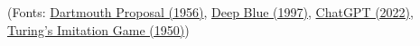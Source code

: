 (Fonts: \href{https://raysolomonoff.com/dartmouth/boxa/dart564props.pdf}{Dartmouth Proposal (1956)}, \href{https://www.ibm.com/history/deep-blue}{Deep Blue (1997)}, \href{https://openai.com/index/chatgpt/}{ChatGPT (2022)}, \href{https://academic.oup.com/mind/article-abstract/LIX/236/433/986238?redirectedF}{Turing's Imitation Game (1950)})
